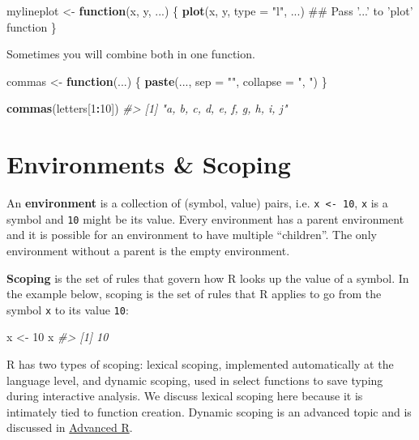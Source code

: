 \documentclass[]{book}
\newenvironment{Shaded}{\begin{snugshade}}{\end{snugshade}}
\newcommand{\KeywordTok}[1]{\textcolor[rgb]{0.13,0.29,0.53}{\textbf{#1}}}
\newcommand{\DataTypeTok}[1]{\textcolor[rgb]{0.13,0.29,0.53}{#1}}
\newcommand{\DecValTok}[1]{\textcolor[rgb]{0.00,0.00,0.81}{#1}}
\newcommand{\StringTok}[1]{\textcolor[rgb]{0.31,0.60,0.02}{#1}}
\newcommand{\CommentTok}[1]{\textcolor[rgb]{0.56,0.35,0.01}{\textit{#1}}}
\newcommand{\ControlFlowTok}[1]{\textcolor[rgb]{0.13,0.29,0.53}{\textbf{#1}}}
\newcommand{\OperatorTok}[1]{\textcolor[rgb]{0.81,0.36,0.00}{\textbf{#1}}}
\newcommand{\NormalTok}[1]{#1}
\begin{document}
\begin{Shaded}
\begin{Highlighting}[]
\NormalTok{mylineplot <-}\StringTok{ }\ControlFlowTok{function}\NormalTok{(x, y, ...) \{}
        \KeywordTok{plot}\NormalTok{(x, y, }\DataTypeTok{type =} \StringTok{"l"}\NormalTok{, ...)         ## Pass '...' to 'plot' function}
\NormalTok{\}}
\end{Highlighting}
\end{Shaded}

Sometimes you will combine both in one function.

\begin{Shaded}
\begin{Highlighting}[]
\NormalTok{commas <-}\StringTok{ }\ControlFlowTok{function}\NormalTok{(...) \{}
  \KeywordTok{paste}\NormalTok{(..., }\DataTypeTok{sep =} \StringTok{""}\NormalTok{, }\DataTypeTok{collapse =} \StringTok{", "}\NormalTok{)}
\NormalTok{\}}

\KeywordTok{commas}\NormalTok{(letters[}\DecValTok{1}\OperatorTok{:}\DecValTok{10}\NormalTok{])}
\CommentTok{#> [1] "a, b, c, d, e, f, g, h, i, j"}
\end{Highlighting}
\end{Shaded}

\section{Environments \& Scoping}\label{environments-scoping}

An \textbf{environment} is a collection of (symbol, value) pairs, i.e.
\texttt{x\ \textless{}-\ 10}, \texttt{x} is a symbol and \texttt{10}
might be its value. Every environment has a parent environment and it is
possible for an environment to have multiple ``children''. The only
environment without a parent is the empty environment.

\textbf{Scoping} is the set of rules that govern how R looks up the
value of a symbol. In the example below, scoping is the set of rules
that R applies to go from the symbol \texttt{x} to its value
\texttt{10}:

\begin{Shaded}
\begin{Highlighting}[]
\NormalTok{x <-}\StringTok{ }\DecValTok{10}
\NormalTok{x}
\CommentTok{#> [1] 10}
\end{Highlighting}
\end{Shaded}

R has two types of scoping: lexical scoping, implemented automatically
at the language level, and dynamic scoping, used in select functions to
save typing during interactive analysis. We discuss lexical scoping here
because it is intimately tied to function creation. Dynamic scoping is
an advanced topic and is discussed in
\href{http://adv-r.had.co.nz}{Advanced R}.
\end{document}
